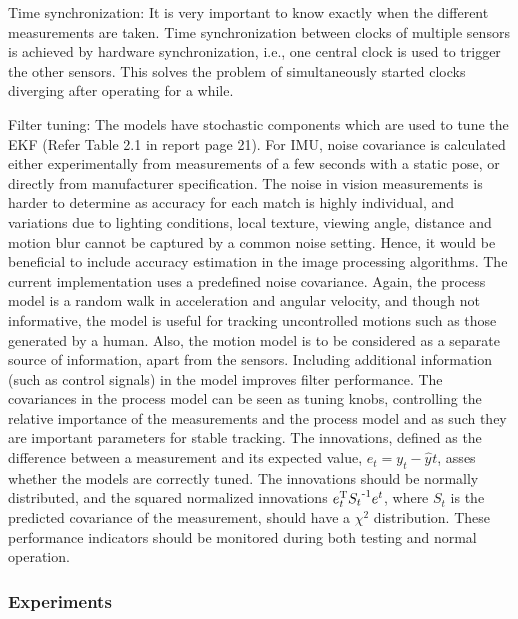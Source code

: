 Time synchronization: It is very important to know exactly when the different measurements are taken. Time synchronization between clocks of multiple sensors is achieved by hardware synchronization, i.e., one central clock is used to trigger the other sensors. This solves the problem of simultaneously started clocks diverging after operating for a while. 

Filter tuning: The models have stochastic components which are used to tune the EKF (Refer Table 2.1 in report page 21). For IMU, noise covariance is calculated either experimentally from measurements of a few seconds with a static pose, or directly from manufacturer specification. The noise in vision measurements is harder to determine as accuracy for each match is highly individual, and variations due to lighting conditions, local texture, viewing angle, distance and motion blur cannot be captured by a common noise setting. Hence, it would be beneficial to include accuracy estimation in the image processing algorithms. 
The current implementation uses a predefined noise covariance. Again, the process model is a random walk in acceleration and angular velocity, and though not informative, the model is useful for tracking uncontrolled motions such as those generated by a human. Also, the motion model is to be considered as a separate source of information, apart from the sensors. Including additional information (such as control signals) in the model improves filter performance. The covariances in the process model can be seen as tuning knobs, controlling the relative importance of the measurements and the process model and as such they are important parameters for stable tracking. The innovations, defined as the difference between a measurement and its expected value, $ e_{t} = y_{t} - \hat{y_{}}t $, asses whether the models are correctly tuned. The innovations should be normally distributed, and the squared normalized innovations $ e_{t}\tpose {S_{t}}\tpose[-1] e^{t} $, where $ S_{t} $ is the predicted covariance of the measurement, should have a $ \chi^{2} $ distribution. These performance indicators should be monitored during both testing and normal operation.

\subsubsection{Experiments}

